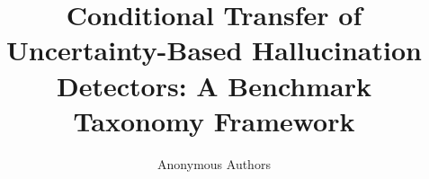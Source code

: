 \documentclass[10pt]{article}
\title{Conditional Transfer of Uncertainty-Based Hallucination Detectors: A Benchmark Taxonomy Framework}
\author{Anonymous Authors}
\date{}
\begin{document}
\maketitle

\begin{abstract}

\end{abstract}











\end{document}

